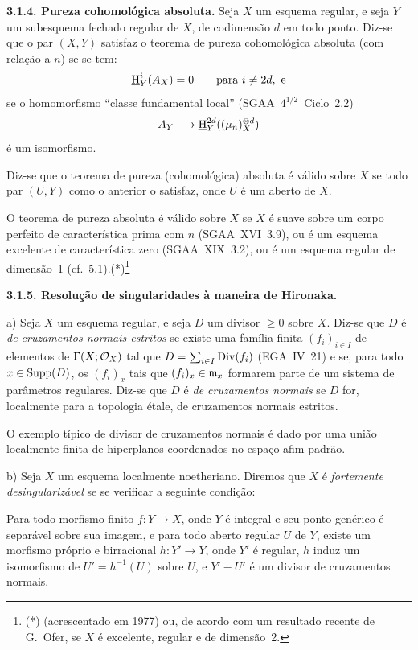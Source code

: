\textbf{3.1.4. Pureza cohomológica absoluta.} Seja $X$ um esquema regular, e seja $Y$ um subesquema fechado regular de $X$, de codimensão $d$ em todo ponto. Diz-se que o par $(X,Y)$ satisfaz o teorema de pureza cohomológica absoluta (com relação a $n$) se se tem:
\[
\underline{\mathrm{H}}^i_Y(A_X) = 0 \qquad \text{para } i \neq 2d, \text{ e}
\]
se o homomorfismo \textquotedblleft classe fundamental local\textquotedblright{} (SGAA~$4^{1/2}$~Ciclo~2.2)
\[
A_Y \longrightarrow \underline{\mathrm{H}}^{2d}_Y((\mu_n)^{\otimes d}_X)
\]
é um isomorfismo.

Diz-se que o teorema de pureza (cohomológica) absoluta é válido sobre $X$ se todo par $(U,Y)$ como o anterior o satisfaz, onde $U$ é um aberto de $X$.

O teorema de pureza absoluta é válido sobre $X$ se $X$ é suave sobre um corpo perfeito de característica prima com $n$ (SGAA~XVI~3.9), ou é um esquema excelente de característica zero (SGAA~XIX~3.2), ou é um esquema regular de dimensão~1 (cf.~5.1).(*)\footnote{(*) (acrescentado em 1977) ou, de acordo com um resultado recente de G.~Ofer, se $X$ é excelente, regular e de dimensão~2.}

\textbf{3.1.5. Resolução de singularidades à maneira de Hironaka.}

a) Seja $X$ um esquema regular, e seja $D$ um divisor $\geqslant 0$ sobre $X$. Diz-se que $D$ é \emph{de cruzamentos normais estritos} se existe uma família finita $(f_i)_{i \in I}$ de elementos de $\Gamma(X; \mathcal{O}_X)$ tal que $D = \sum_{i \in I} \operatorname{Div}(f_i)$ (EGA~IV~21) e se, para todo $x \in \operatorname{Supp}(D)$, os $(f_i)_x$ tais que $(f_i)_x \in \mathfrak m_x$ formarem parte de um sistema de parâmetros regulares. Diz-se que $D$ é \emph{de cruzamentos normais} se $D$ for, localmente para a topologia étale, de cruzamentos normais estritos.

O exemplo típico de divisor de cruzamentos normais é dado por uma união localmente finita de hiperplanos coordenados no espaço afim padrão.

b) Seja $X$ um esquema localmente noetheriano. Diremos que $X$ é \emph{fortemente desingularizável} se se verificar a seguinte condição:

Para todo morfismo finito $f : Y \to X$, onde $Y$ é integral e seu ponto genérico é separável sobre sua imagem, e para todo aberto regular $U$ de $Y$, existe um morfismo próprio e birracional $h : Y' \to Y$, onde $Y'$ é regular, $h$ induz um isomorfismo de $U' = h^{-1}(U)$ sobre $U$, e $Y' - U'$ é um divisor de cruzamentos normais.

